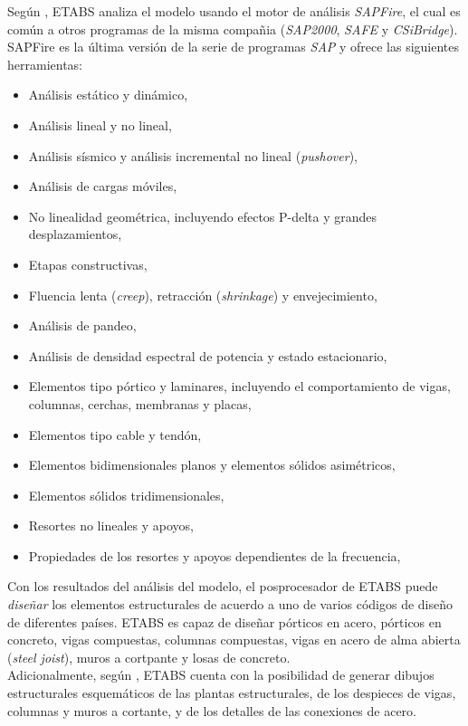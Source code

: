 Según \cite{ETABS2017analysisreferencemanual}, ETABS analiza el modelo usando el motor de análisis \emph{SAPFire}, el cual es común a otros programas de la misma compañia (\emph{SAP2000}, \emph{SAFE} y \emph{CSiBridge}). SAPFire es la última versión de la serie de programas \emph{SAP} y ofrece las siguientes herramientas:
\begin{itemize}
\item Análisis estático y dinámico,
\item Análisis lineal y no lineal,
\item Análisis sísmico y análisis incremental no lineal (\emph{pushover}),
\item Análisis de cargas móviles,
\item No linealidad geométrica, incluyendo efectos P-delta y grandes desplazamientos,
\item Etapas constructivas,
\item Fluencia lenta (\emph{creep}), retracción (\emph{shrinkage}) y envejecimiento,
\item Análisis de pandeo,
\item Análisis de densidad espectral de potencia y estado estacionario,
\item Elementos tipo pórtico y laminares, incluyendo el comportamiento de vigas, columnas, cerchas, membranas y placas,
\item Elementos tipo cable y tendón,
\item Elementos bidimensionales planos y elementos sólidos asimétricos,
\item Elementos sólidos tridimensionales,
\item Resortes no lineales y apoyos,
\item Propiedades de los resortes y apoyos dependientes de la frecuencia,
\end{itemize}

Con los resultados del análisis del modelo, el posprocesador de ETABS puede \emph{diseñar} los elementos estructurales de acuerdo a uno de varios códigos de diseño de diferentes países. ETABS es capaz de diseñar pórticos en acero, pórticos en concreto, vigas compuestas, columnas compuestas, vigas en acero de alma abierta (\emph{steel joist}), muros a cortpante y losas de concreto.\\

Adicionalmente, según \cite{ETABS2019welcome}, ETABS cuenta con la posibilidad de generar dibujos estructurales esquemáticos de las plantas estructurales, de los despieces de vigas, columnas y muros a cortante, y de los detalles de las conexiones de acero.\\

